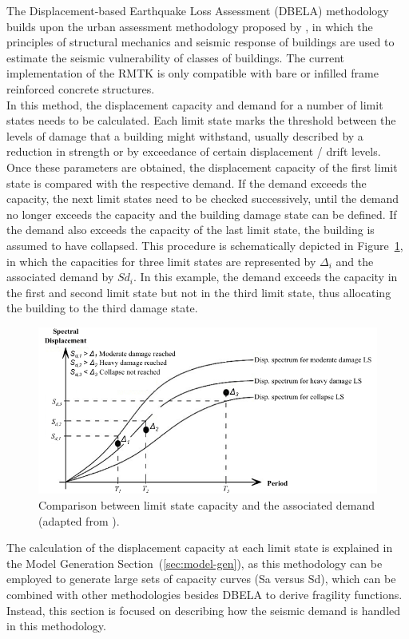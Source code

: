 The Displacement-based Earthquake Loss Assessment (DBELA) methodology builds upon the urban assessment methodology proposed by \cite{Calvi1999}, in which the principles of structural mechanics and seismic response of buildings are used to estimate the seismic vulnerability of classes of buildings. The current implementation of the RMTK is only compatible with bare or infilled frame reinforced concrete structures.\\

In this method, the displacement capacity and demand for a number of limit states needs to be calculated. Each limit state marks the threshold between the levels of damage that a building might withstand, usually described by a reduction in strength or by exceedance of certain displacement / drift levels. Once these parameters are obtained, the displacement capacity of the first limit state is compared with the respective demand. If the demand exceeds the capacity, the next limit states need to be checked successively, until the demand no longer exceeds the capacity and the building damage state can be defined. If the demand also exceeds the capacity of the last limit state, the building is assumed to have collapsed. This procedure is schematically depicted in Figure~\ref{fig:DBELA_scheme}, in which the capacities for three limit states are represented by $\Delta_i$ and the associated demand by $Sd_i$. In this example, the demand exceeds the capacity in the first and second limit state but not in the third limit state, thus allocating the building to the third damage state.

\begin{figure}[htb]
  \centering
      \includegraphics[width=12cm]{figures/DBELA_scheme.png}
  \caption{Comparison between limit state capacity and the associated demand (adapted from \cite{BalEtAl2010}).}
  \label{fig:DBELA_scheme}
\end{figure}

The calculation of the displacement capacity at each limit state is explained in the Model Generation Section~(\ref{sec:model-gen}), as this methodology can be employed to generate large sets of capacity curves (Sa versus Sd), which can be combined with other methodologies besides DBELA to derive fragility functions. Instead, this section is focused on describing how the seismic demand is handled in this methodology.\\

